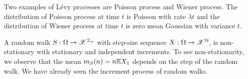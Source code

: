\documentclass[letterpaper,10pt,english]{article}
\begin{document}
\begin{shaded}
\begin{exmp}
Two examples of L\'evy processes are Poisson process and Wiener process. 
The distribution of Poisson process at time $t$ is Poisson with rate $\lambda t$ and the distribution of Wiener process at time $t$ is zero mean Gaussian with variance $t$. 
\end{exmp}

\begin{exmp}
A random walk $S:\Omega\to\mathscr{X}^{\mathbb{Z}_+}$ with \iid step-size sequence $X:\Omega\to\mathscr{X}^{\mathbb{N}}$, is non-stationary with stationary and independent increments. 
To see non-stationarity, we observe that the mean $m_S(n) = n \mathbb{E} X_1$ depends on the step of the random walk. 
We have already seen the increment process of random walks. 
\end{exmp}
%
\end{shaded}
\end{document}
